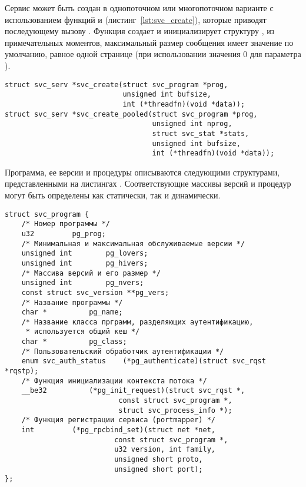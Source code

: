 Сервис может быть создан в однопоточном или многопоточном варианте с
использованием функций  и 
(листинг~\ref{lst:svc_create}), которые приводят последующему вызову
. Функция создает и инициализирует структуру
, из примечательных моментов, максимальный размер сообщения
 имеет значение по умолчанию, равное одной странице (при
использовании значения 0 для параметра ).

\begin{lstlisting}[caption={Создание сервиса}, label={lst:svc_create}]
struct svc_serv *svc_create(struct svc_program *prog,
                            unsigned int bufsize,
                            int (*threadfn)(void *data));
struct svc_serv *svc_create_pooled(struct svc_program *prog,
                                   unsigned int nprog,
                                   struct svc_stat *stats,
                                   unsigned int bufsize,
                                   int (*threadfn)(void *data));
\end{lstlisting}

Программа, ее версии и процедуры описываются следующими структурами,
представленными на листингах
. Соответствующие
массивы версий и процедур могут быть определены как статически, так и
динамически.

\begin{lstlisting}[caption={Структура программы}, label={lst:struct_svc_program}]
struct svc_program {
    /* Номер программы */
    u32         pg_prog;
    /* Минимальная и максимальная обслуживаемые версии */
    unsigned int        pg_lovers;
    unsigned int        pg_hivers;
    /* Массива версий и его размер */
    unsigned int        pg_nvers;
    const struct svc_version **pg_vers;
    /* Название программы */
    char *          pg_name;
    /* Название класса прграмм, разделяющих аутентификацию,
     * используется общий кеш */
    char *          pg_class;
    /* Пользовательский обработчик аутентификации */
    enum svc_auth_status    (*pg_authenticate)(struct svc_rqst *rqstp);
    /* Функция инициализации контекста потока */
    __be32          (*pg_init_request)(struct svc_rqst *,
                           const struct svc_program *,
                           struct svc_process_info *);
    /* Функция регистрации сервиса (portmapper) */
    int         (*pg_rpcbind_set)(struct net *net,
                          const struct svc_program *,
                          u32 version, int family,
                          unsigned short proto,
                          unsigned short port);
};
\end{lstlisting}

